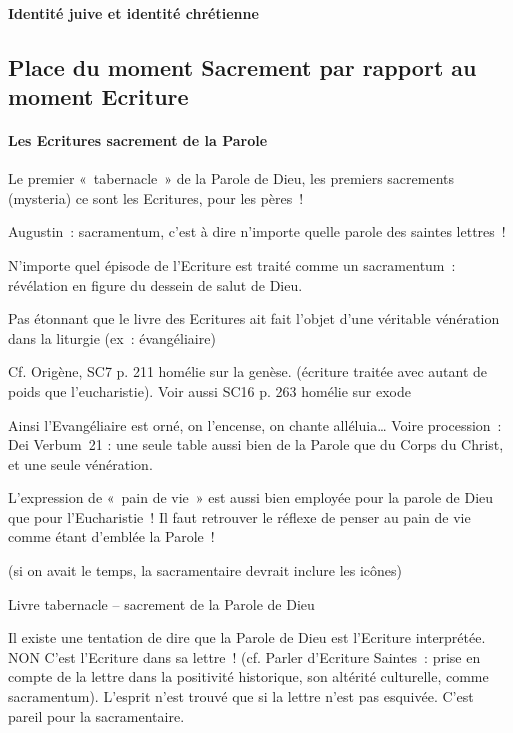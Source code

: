 \hypertarget{identituxe9-juive-et-identituxe9-chruxe9tienne}{%
\paragraph{Identité juive et identité
chrétienne}\label{identituxe9-juive-et-identituxe9-chruxe9tienne}}

\hypertarget{place-du-moment-sacrement-par-rapport-au-moment-ecriture}{%
\subsection{Place du moment Sacrement par rapport au moment
Ecriture}\label{place-du-moment-sacrement-par-rapport-au-moment-ecriture}}

\hypertarget{les-ecritures-sacrement-de-la-parole}{%
\paragraph{Les Ecritures sacrement de la
Parole}\label{les-ecritures-sacrement-de-la-parole}}

Le premier «~tabernacle~» de la Parole de Dieu, les premiers sacrements
(mysteria) ce sont les Ecritures, pour les pères~!

Augustin~: sacramentum, c'est à dire n'importe quelle parole des saintes
lettres~!

N'importe quel épisode de l'Ecriture est traité comme un sacramentum~:
révélation en figure du dessein de salut de Dieu.

Pas étonnant que le livre des Ecritures ait fait l'objet d'une véritable
vénération dans la liturgie (ex~: évangéliaire)

Cf. Origène, SC7 p. 211 homélie sur la genèse. (écriture traitée avec
autant de poids que l'eucharistie). Voir aussi SC16 p. 263 homélie sur
exode

Ainsi l'Evangéliaire est orné, on l'encense, on chante alléluia\ldots{}
Voire procession~: Dei Verbum~21 : une seule table aussi bien de la
Parole que du Corps du Christ, et une seule vénération.

L'expression de «~pain de vie~» est aussi bien employée pour la parole
de Dieu que pour l'Eucharistie~! Il faut retrouver le réflexe de penser
au pain de vie comme étant d'emblée la Parole~!

(si on avait le temps, la sacramentaire devrait inclure les icônes)

Livre tabernacle -- sacrement de la Parole de Dieu

Il existe une tentation de dire que la Parole de Dieu est l'Ecriture
interprétée. NON C'est l'Ecriture dans sa lettre~! (cf. Parler
d'Ecriture Saintes~: prise en compte de la lettre dans la positivité
historique, son altérité culturelle, comme sacramentum). L'esprit n'est
trouvé que si la lettre n'est pas esquivée. C'est pareil pour la
sacramentaire.

